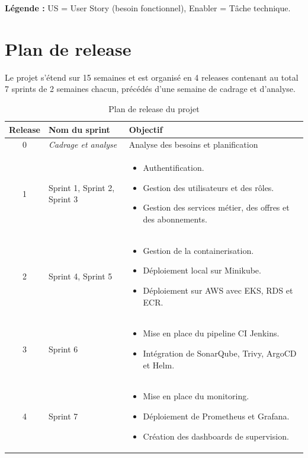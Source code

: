 \textbf{Légende :} US = User Story (besoin fonctionnel), Enabler = Tâche technique.

\section{Plan de release}

Le projet s'étend sur 15 semaines et est organisé en 4 releases contenant au total 7 sprints de 2 semaines chacun, précédés d'une semaine de cadrage et d'analyse.

\begin{table}[H]
    \centering
    \renewcommand{\arraystretch}{1.3}
    \begin{tabular}{|c|p{4cm}|p{8cm}|}
        \hline
        \textbf{Release} & \textbf{Nom du sprint} & \textbf{Objectif} \\
        \hline
        0 & \textit{Cadrage et analyse} & Analyse des besoins et planification \\
        \hline
        1 & Sprint 1, Sprint 2, Sprint 3 &
        \begin{itemize}
            \item Authentification.
            \item Gestion des utilisateurs et des rôles.
            \item Gestion des services métier, des offres et des abonnements.
        \end{itemize} \\
        \hline
        2 & Sprint 4, Sprint 5 &
        \begin{itemize}
            \item Gestion de la containerisation.
            \item Déploiement local sur Minikube.
            \item Déploiement sur AWS avec EKS, RDS et ECR.
        \end{itemize} \\
        \hline
        3 & Sprint 6 &
        \begin{itemize}
            \item Mise en place du pipeline CI Jenkins.
            \item Intégration de SonarQube, Trivy, ArgoCD et Helm.
        \end{itemize} \\
        \hline
        4 & Sprint 7 &
        \begin{itemize}
            \item Mise en place du monitoring.
            \item Déploiement de Prometheus et Grafana.
            \item Création des dashboards de supervision.
        \end{itemize} \\
        \hline
    \end{tabular}
    \caption{Plan de release du projet}
    \label{tab:plan_release}
\end{table}

